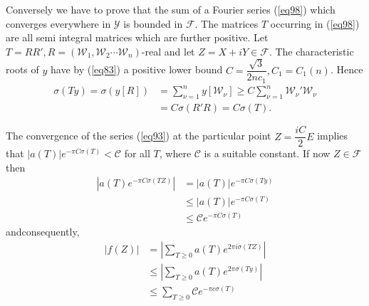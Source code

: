 Conversely we have to prove that the sum of a Fourier series (\ref{eq98})
which converges everywhere in $\mathscr{Y}$ is bounded in
$\mathcal{F}$. The matrices $T$ occurring in (\ref{eq98}) are all semi
integral matrices which are further positive. Let
$T=RR',R=(\mathscr{W}_1,\mathscr{W}_2 \cdots \mathscr{W}_n)$-real and
let $Z=X+iY \in \mathcal{F}$. The characteristic roots of $y$ have by
(\ref{eq83}) a positive lower bound $C=
\dfrac{\sqrt{3}}{2nc_1},C_1=C_1(n)$. Hence  
\begin{align*}
\sigma (Ty)= \sigma (y[R])&= \sum ^n_{\nu =1}y [\mathscr{W}_\nu] \ge C
\sum ^n _{\nu =1} \mathscr{W}_\nu '\mathscr{W}_\nu \\ 
&= C \sigma (R'R)= C \sigma (T).
\end{align*}

The convergence of the series (\ref{eq93}) at the particular point $Z=
\dfrac{iC}{2} E$ implies that $| a (T)| e^{- \pi C \sigma (T)} <
\mathscr{C}$ \qquad for all $T$, where $\mathscr{C}$ is a suitable
constant. If now $Z \in \mathcal{F}$ then  
\begin{align*}
|a (T)e^{- \pi C \sigma (TZ)}| &=|a (T)|e^{- \pi C \sigma
  (Ty)}\\ 
& \le |a (T)|e^{- \pi C \sigma (T)}\\
& \le \mathscr{C}e^{- \pi C \sigma (T)}
\end{align*}
and\pageoriginale consequently,
\begin{align*}
|f(Z)|&= |\sum_{T\ge 0} a (T)e^{2 \pi i \sigma (TZ)}|\\
&\le |\sum_{T\ge 0}a (T)e^{2 \pi  \sigma (Ty)}|\\
&\le \sum_{T\ge 0} \mathscr{C}e^{- \pi  c\sigma (T)}
\end{align*}

